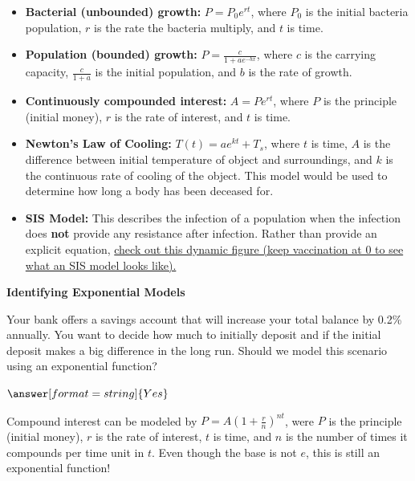 \documentclass{ximera}
\begin{document}
\begin{itemize}
	\item \textbf{Bacterial (unbounded) growth:} $P = P_0e^{rt}$, where $P_0$ is the initial bacteria population, $r$ is the rate the bacteria multiply, and $t$ is time. 
	\item \textbf{Population (bounded) growth:} $P = \frac{c}{1+ae^{-bx}}$, where $c$ is the carrying capacity, $\frac{c}{1+a}$ is the initial population, and $b$ is the rate of growth.  
	\item \textbf{Continuously compounded interest:} $A = Pe^{rt}$, where $P$ is the principle (initial money), $r$ is the rate of interest, and $t$ is time.
	\item \textbf{Newton's Law of Cooling:} $T(t) = ae^{kt} + T_s$, where $t$ is time, $A$ is the difference between initial temperature of object and surroundings, and $k$ is the continuous rate of cooling of the object. This model would be used to determine how long a body has been deceased for.
	\item \textbf{SIS Model:} This describes the infection of a population when the infection does \textbf{not} provide any resistance after infection. Rather than provide an explicit equation, \href{http://rocs.hu-berlin.de/D3/herd/}{check out this dynamic figure (keep vaccination at 0 to see what an SIS model looks like).} 
\end{itemize}

\begin{center} \textbf{\Large Identifying Exponential Models} \end{center}

\begin{question}
	Your bank offers a savings account that will increase your total balance by 0.2\% annually. You want to decide how much to initially deposit and if the initial deposit makes a big difference in the long run. Should we model this scenario using an exponential function?
	
	$\answer[format=string]{Yes}$
	
	\begin{feedback}
		Compound interest can be modeled by $P = A (1 + \frac{r}{n})^{nt}$, were $P$ is the principle (initial money), $r$ is the rate of interest, $t$ is time, and $n$ is the number of times it compounds per time unit in $t$. Even though the base is not $e$, this is still an exponential function!
	\end{feedback}
\end{question}
\end{document}
